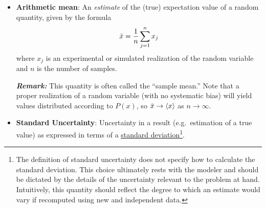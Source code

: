 \begin{itemize}
\item {\bf Arithmetic mean}: An \emph{estimate} of the (true) expectation value of a random quantity, given by the formula
  \begin{equation}
    \bar{x} = \dfrac{1}{n} \sum_{j=1}^{n} x_j \label{def:arith_mean}
  \end{equation}
  where $x_j$ is an experimental or simulated realization of the random variable and $n$ is the number of samples. 
\smallskip 

\textbf{\textit{Remark:}} This quantity is often called the ``sample mean.''
Note that a proper realization of a random variable (with no systematic bias) will yield values distributed according to $P(x)$, so $\bar{x} \rightarrow \langle x \rangle$ as $n \rightarrow \infty$.


\item {\bf Standard Uncertainty}: Uncertainty in a result (e.g.\ estimation of a true value) as expressed in terms of a \hyperref[def:st_dev]{standard deviation}\footnote{The definition of standard uncertainty does not specify how to calculate the standard deviation. This choice ultimately rests with the modeler and should be dictated by the details of the uncertainty relevant to the problem at hand.  Intuitively, this quantity should reflect the degree to which an estimate would vary if recomputed using new and independent data.}.
  \label{def:std_unc}


\end{itemize}
